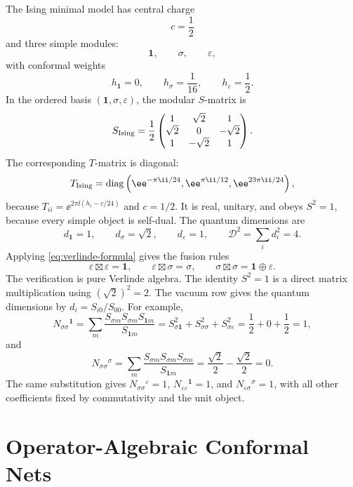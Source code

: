 The Ising minimal model has central charge
\[
  c=\frac12
\]
and three simple modules:
\[
  \mathbf 1,\qquad \sigma,\qquad \varepsilon ,
\]
with conformal weights
\[
  h_{\mathbf 1}=0,\qquad h_\sigma=\frac1{16},\qquad
  h_\varepsilon=\frac12 .
\]
In the ordered basis \((\mathbf 1,\sigma,\varepsilon)\), the modular
\(S\)-matrix is
\begin{equation}
  S_{\rm Ising}
  =
  \frac12
  \begin{pmatrix}
    1 & \sqrt2 & 1\\
    \sqrt2 & 0 & -\sqrt2\\
    1 & -\sqrt2 & 1
  \end{pmatrix}.
  \label{eq:ising-modular-s}
\end{equation}
The corresponding \(T\)-matrix is diagonal:
\begin{equation}
  T_{\rm Ising}
  =
  \operatorname{diag}\left(
    \ee^{-\pi\ii/24},
    \ee^{\pi\ii/12},
    \ee^{23\pi\ii/24}
  \right),
  \label{eq:ising-modular-t}
\end{equation}
because \(T_{ii}=\ee^{2\pi\ii(h_i-c/24)}\) and \(c=1/2\).
It is real, unitary, and obeys \(S^2=1\), because every simple object is
self-dual.  The quantum dimensions are
\[
  d_{\mathbf 1}=1,\qquad d_\sigma=\sqrt2,\qquad d_\varepsilon=1,
  \qquad
  \mathcal D^2=\sum_i d_i^2=4.
\]
Applying \eqref{eq:verlinde-formula} gives the fusion rules
\[
  \varepsilon\boxtimes\varepsilon=\mathbf 1,\qquad
  \varepsilon\boxtimes\sigma=\sigma,\qquad
  \sigma\boxtimes\sigma=\mathbf 1\oplus\varepsilon .
\]
The verification is pure Verlinde algebra.  The identity \(S^2=1\) is a direct
matrix multiplication using
\((\sqrt2)^2=2\).  The vacuum row gives the quantum dimensions by
\(d_i=S_{i0}/S_{00}\).  For example,
\[
  N_{\sigma\sigma}{}^{\mathbf 1}
  =
  \sum_m\frac{S_{\sigma m}S_{\sigma m}S_{\mathbf 1m}}{S_{\mathbf 1m}}
  =
  S_{\sigma\mathbf 1}^2+S_{\sigma\sigma}^2+S_{\sigma\varepsilon}^2
  =
  \frac12+0+\frac12=1,
\]
and
\[
  N_{\sigma\sigma}{}^\sigma
  =
  \sum_m\frac{S_{\sigma m}S_{\sigma m}S_{\sigma m}}{S_{\mathbf 1m}}
  =
  \frac{\sqrt2}{2}-\frac{\sqrt2}{2}=0.
\]
The same substitution gives
\(N_{\sigma\sigma}{}^\varepsilon=1\),
\(N_{\varepsilon\varepsilon}{}^{\mathbf 1}=1\), and
\(N_{\varepsilon\sigma}{}^\sigma=1\), with all other coefficients fixed by
commutativity and the unit object.

\section{Operator-Algebraic Conformal Nets}
\label{sec:operator-algebraic-conformal-nets}

